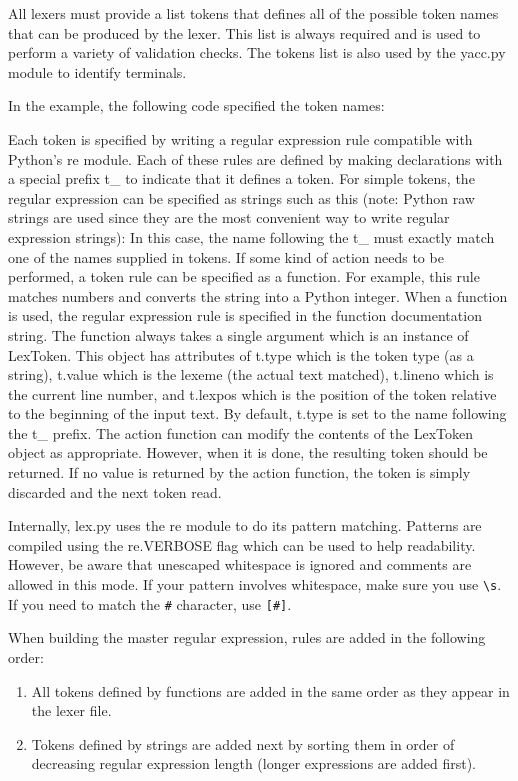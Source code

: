 All lexers must provide a list tokens that defines all of the possible token
names that can be produced by the lexer. This list is always required and is
used to perform a variety of validation checks. The tokens list is also used by
the yacc.py module to identify terminals.

In the example, the following code specified the token names:


Each token is specified by writing a regular expression rule compatible with
Python's re module. Each of these rules are defined by making declarations with
a special prefix t\_ to indicate that it defines a token. For simple tokens, the
regular expression can be specified as strings such as this (note: Python raw
strings are used since they are the most convenient way to write regular
expression strings):
In this case, the name following the t\_ must exactly match one of the names
supplied in tokens. If some kind of action needs to be performed, a token rule
can be specified as a function. For example, this rule matches numbers and
converts the string into a Python integer.
When a function is used, the regular expression rule is specified in the
function documentation string. The function always takes a single argument which
is an instance of LexToken. This object has attributes of t.type which is the
token type (as a string), t.value which is the lexeme (the actual text matched),
t.lineno which is the current line number, and t.lexpos which is the position of
the token relative to the beginning of the input text. By default, t.type is set
to the name following the t\_ prefix. The action function can modify the
contents of the LexToken object as appropriate. However, when it is done, the
resulting token should be returned. If no value is returned by the action
function, the token is simply discarded and the next token read.

Internally, lex.py uses the re module to do its pattern matching. Patterns are
compiled using the re.VERBOSE flag which can be used to help readability.
However, be aware that unescaped whitespace is ignored and comments are allowed
in this mode. If your pattern involves whitespace, make sure you use \verb|\s|.
If you need to match the \verb|#| character, use \verb|[#]|.

When building the master regular expression, rules are added in the following
order:
\begin{enumerate}[nosep]
  \item 
All tokens defined by functions are added in the same order as they appear in
the lexer file.
  \item 
Tokens defined by strings are added next by sorting them in order of decreasing
regular expression length (longer expressions are added first).
\end{enumerate}

